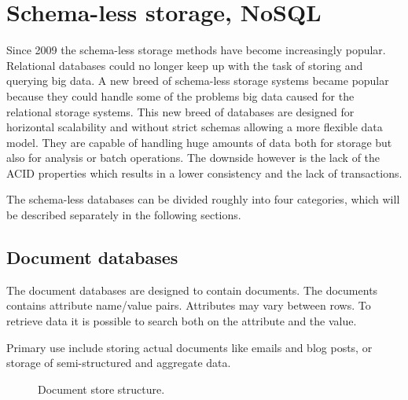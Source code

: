 \section{Schema-less storage, NoSQL}
\label{sec:nosql}
Since 2009 the schema-less storage methods have become increasingly popular.
Relational databases could no longer keep up with the task of storing and querying big data.
A new breed of schema-less storage systems became popular because they could handle some of the problems big data caused for the relational storage systems.
This new breed of databases are designed for horizontal scalability and without strict schemas allowing a more flexible data model. 
They are capable of handling huge amounts of data both for storage but also for analysis or batch operations.
The downside however is the lack of the ACID properties which results in a lower consistency and the lack of transactions. %

The schema-less databases can be divided roughly into four categories\cite{Fowler:IntroNoSQL, Moniruzzaman:NoSQLDatabaseNewEraOfDatabasesForBigDataAnalysis}, which will be described separately in the following sections.

\subsection{Document databases}
The document databases are designed to contain documents.
The documents contains attribute name/value pairs.
Attributes may vary between rows.
To retrieve data it is possible to search both on the attribute and the value.

Primary use include storing actual documents like emails and blog posts, or storage of semi-structured and aggregate data.

\begin{figure}
	\centering


		\caption[Document store]{
			\label{fig:DocumentStore}
			\footnotesize{%
				Document store structure.
			} 
	}
\end{figure}

